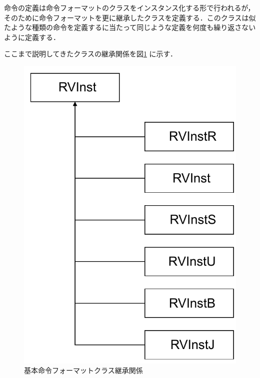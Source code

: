 命令の定義は命令フォーマットのクラスをインスタンス化する形で行われるが，そのために命令フォーマットを更に継承したクラスを定義する．このクラスは似たような種類の命令を定義するに当たって同じような定義を何度も繰り返さないように定義する．

ここまで説明してきたクラスの継承関係を図\ref{fig:InstFromat_class}%
に示す．

\begin{figure}[tb]
    \centering
    \includegraphics[scale=0.5]{image/InstFormat_class.pdf}
    \caption{基本命令フォーマットクラス継承関係}
    \label{fig:InstFromat_class}
\end{figure}